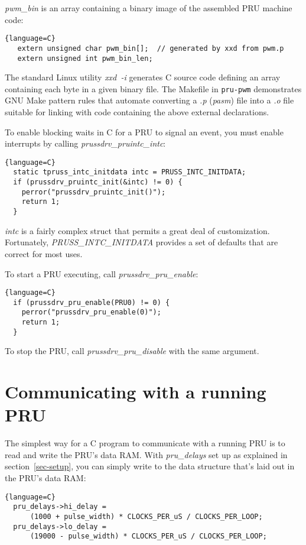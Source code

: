 \documentclass[letterpaper,11pt,fleqn]{article}
\begin{document}
\textit{pwm\_bin} is an array containing a binary image of the assembled PRU
machine code:

\begin{lstlisting}{language=C}
   extern unsigned char pwm_bin[];  // generated by xxd from pwm.p
   extern unsigned int pwm_bin_len;
\end{lstlisting}

The standard Linux utility \textit{xxd~-i} generates C source code defining
an array containing each byte in a given binary file. The Makefile in
\texttt{pru-pwm} demonstrates GNU Make pattern rules that automate converting
a \textit{.p} (\textit{pasm}) file into a \textit{.o} file suitable for
linking with code containing the above external declarations.

To enable blocking waits in C for a PRU to signal an event, you must enable
interrupts by calling \textit{prussdrv\_pruintc\_intc}:

\begin{lstlisting}{language=C}
  static tpruss_intc_initdata intc = PRUSS_INTC_INITDATA;
  if (prussdrv_pruintc_init(&intc) != 0) {
    perror("prussdrv_pruintc_init()");
    return 1;
  }
\end{lstlisting}

\noindent
\textit{intc} is a fairly complex struct that permits a great deal of
customization.  Fortunately, \textit{PRUSS\_INTC\_INITDATA} provides a set of
defaults that are correct for most uses.

To start a PRU executing, call \textit{prussdrv\_pru\_enable}:

\begin{lstlisting}{language=C}
  if (prussdrv_pru_enable(PRU0) != 0) {
    perror("prussdrv_pru_enable(0)");
    return 1;
  }
\end{lstlisting}

To stop the PRU, call \textit{prussdrv\_pru\_disable} with the same argument.

\section{Communicating with a running PRU}

The simplest way for a C program to communicate with a running PRU is to
read and write the PRU's data RAM. With \textit{pru\_delays} set up as
explained in section~\ref{sec-setup}, you can simply write to the data
structure that's laid out in the PRU's data RAM:

\begin{lstlisting}{language=C}
  pru_delays->hi_delay =
      (1000 + pulse_width) * CLOCKS_PER_uS / CLOCKS_PER_LOOP;
  pru_delays->lo_delay =
      (19000 - pulse_width) * CLOCKS_PER_uS / CLOCKS_PER_LOOP;
\end{lstlisting}
\end{document}
